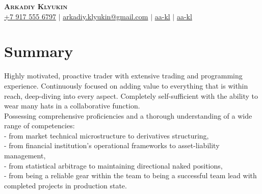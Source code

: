 \documentclass[a4paper,hidelinks,20pt]{article}
\begin{document}

\begin{center}
  \textbf{\Huge \scshape Arkadiy Klyukin} \\ \vspace{1pt}
  \small
  \faMobile \hspace{.5pt} \href{tel:+79175556797}{+7 917 555 6797}
  $|$
  \faAt \hspace{.5pt} \href{mailto:arkadiy.klyukin@gmail.com}{arkadiy.klyukin@gmail.com}
  $|$
  \faLinkedinSquare \hspace{.5pt} \href{https://www.linkedin.com/in/aa-kl}{aa-kl}
  $|$
  \faGithub \hspace{.5pt} \href{https://github.com/aa-kl}{aa-kl}
\end{center}

\vspace{-15pt}
\section{Summary}
Highly motivated, proactive trader with extensive trading and programming experience. Continuously focused on adding value to everything that is within reach, deep-diving into every aspect. Completely self-sufficient with the ability to wear many hats in a collaborative function.\\
Possessing comprehensive proficiencies and a thorough understanding of a wide range of competencies:\\
- from market technical microstructure to derivatives structuring,\\
- from financial institution's operational frameworks to asset-liability management,\\
- from statistical arbitrage to maintaining directional naked positions,\\
- from being a reliable gear within the team to being a successful team lead with completed projects in production state.\\

\vspace{-3pt}
\end{document}
